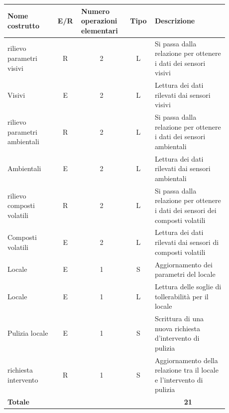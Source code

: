 \documentclass[12pt,a4paper]{article}
\begin{document}
\begin{center}\setlength{\extrarowheight}{1.5pt}\begin{longtable}{|p{0.2\linewidth}|p{0.1\linewidth}|p{0.175\linewidth}|p{0.1\linewidth}|p{0.3\linewidth}|}\hline \textbf{Nome costrutto}   & \multicolumn{1}{|c|}{\textbf{E/R}} & \textbf{Numero operazioni elementari} & \multicolumn{1}{|c|}{\textbf{Tipo}} & \textbf{Descrizione}\\ 
\hline
rilievo parametri visivi
 & 
\multicolumn{1}{|c|}{R}
 & 
\multicolumn{1}{|c|}{2}
 & 
\multicolumn{1}{|c|}{L}
 & 
Si passa dalla relazione per ottenere i dati dei sensori visivi
\\
\hline
Visivi
 & 
\multicolumn{1}{|c|}{E}
 & 
\multicolumn{1}{|c|}{2}
 & 
\multicolumn{1}{|c|}{L}
 & 
Lettura dei dati rilevati dai sensori visivi
\\
\hline
rilievo parametri ambientali
 & 
\multicolumn{1}{|c|}{R}
 & 
\multicolumn{1}{|c|}{2}
 & 
\multicolumn{1}{|c|}{L}
 & 
Si passa dalla relazione per ottenere i dati dei sensori ambientali
\\
\hline
Ambientali
 & 
\multicolumn{1}{|c|}{E}
 & 
\multicolumn{1}{|c|}{2}
 & 
\multicolumn{1}{|c|}{L}
 & 
Lettura dei dati rilevati dai sensori ambientali
\\
\hline
rilievo composti volatili
 & 
\multicolumn{1}{|c|}{R}
 & 
\multicolumn{1}{|c|}{2}
 & 
\multicolumn{1}{|c|}{L}
 & 
Si passa dalla relazione per ottenere i dati dei sensori dei composti volatili
\\
\hline
Composti volatili
 & 
\multicolumn{1}{|c|}{E}
 & 
\multicolumn{1}{|c|}{2}
 & 
\multicolumn{1}{|c|}{L}
 & 
Lettura dei dati rilevati dai sensori di composti volatili
\\
\hline
Locale
 & 
\multicolumn{1}{|c|}{E}
 & 
\multicolumn{1}{|c|}{1}
 & 
\multicolumn{1}{|c|}{S}
 & 
Aggiornamento dei parametri del locale
\\
\hline
Locale
 & 
\multicolumn{1}{|c|}{E}
 & 
\multicolumn{1}{|c|}{1}
 & 
\multicolumn{1}{|c|}{L}
 & 
Lettura delle soglie di tollerabilità per il locale
\\
\hline
Pulizia locale
 & 
\multicolumn{1}{|c|}{E}
 & 
\multicolumn{1}{|c|}{1}
 & 
\multicolumn{1}{|c|}{S}
 & 
Scrittura di una nuova richiesta d'intervento di pulizia
\\
\hline
richiesta intervento
 & 
\multicolumn{1}{|c|}{R}
 & 
\multicolumn{1}{|c|}{1}
 & 
\multicolumn{1}{|c|}{S}
 & 
Aggiornamento della relazione tra il locale e l'intervento di pulizia
\\
\hline
\multicolumn{4}{|l|}{\textbf{Totale}}
 & 
\multicolumn{1}{|c|}{\textbf{21}}
\\
\hline
\end{longtable}\end{center}
\pagebreak
\end{document}
